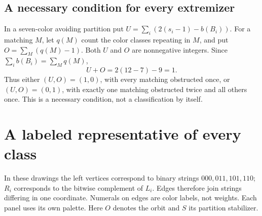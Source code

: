 \documentclass[11pt,letterpaper]{article}
\begin{document}
\subsection*{A necessary condition for every extremizer}
In a seven-color avoiding partition put
$U=\sum_i(2(s_i-1)-b(B_i))$. For a matching $M$, let $q(M)$ count the
color classes repeating in $M$, and put $O=\sum_M(q(M)-1)$.
Both $U$ and $O$ are nonnegative integers. Since
$\sum_i b(B_i)=\sum_M q(M)$,
\[
 U+O=2(12-7)-9=1.
\]
Thus either $(U,O)=(1,0)$, with every matching obstructed once, or
$(U,O)=(0,1)$, with exactly one matching obstructed twice and all others once.
This is a necessary condition, not a classification by itself.

\newpage
\section{A labeled representative of every class}
In these drawings the left vertices correspond to binary strings
$000,011,101,110$; $R_i$ corresponds to the bitwise complement of $L_i$.
Edges therefore join strings differing in one coordinate. Numerals on edges
are color labels, not weights. Each panel uses its own palette.
Here $O$ denotes the orbit and $S$ its partition stabilizer.
\end{document}
